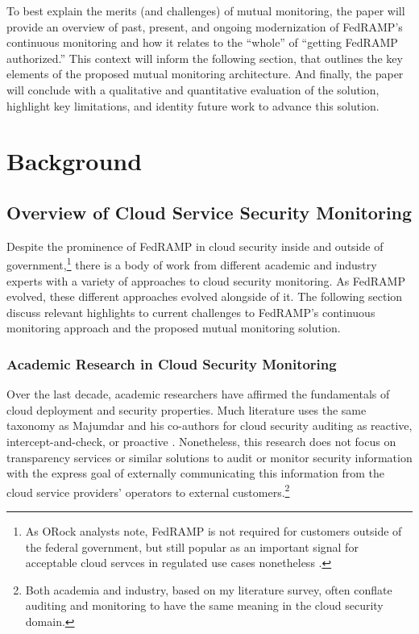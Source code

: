\documentclass{jdf}
\begin{document}
To best explain the merits (and challenges) of mutual monitoring, the paper will provide an overview of past, present, and ongoing modernization of FedRAMP's continuous monitoring and how it relates to the ``whole'' of ``getting FedRAMP authorized.'' This context will inform the following section, that outlines the key elements of the proposed mutual monitoring architecture. And finally, the paper will conclude with a qualitative and quantitative evaluation of the solution, highlight key limitations, and identity future work to advance this solution.

\section{Background}

\subsection{Overview of Cloud Service Security Monitoring}

Despite the prominence of FedRAMP in cloud security inside and outside of government,\footnote{As ORock analysts note, FedRAMP is not required for customers outside of the federal government, but still popular as an important signal for acceptable cloud servces in regulated use cases nonetheless \citeyear{orock21}.} there is a body of work from different academic and industry experts with a variety of approaches to cloud security monitoring. As FedRAMP evolved, these different approaches evolved alongside of it. The following section discuss relevant highlights to current challenges to FedRAMP's continuous monitoring approach and the proposed mutual monitoring solution.

\subsubsection{Academic Research in Cloud Security Monitoring}

Over the last decade, academic researchers have affirmed the fundamentals of cloud deployment and security properties. Much literature uses the same taxonomy as Majumdar and his co-authors for cloud security auditing as reactive, intercept-and-check, or proactive \citeyear[pp.~9-13]{majumdar19}. Nonetheless, this research does not focus on transparency services or similar solutions to audit or monitor security information with the express goal of externally communicating this information from the cloud service providers' operators to external customers.\footnote{Both academia and industry, based on my literature survey, often conflate auditing and monitoring to have the same meaning in the cloud security domain.}
\end{document}
